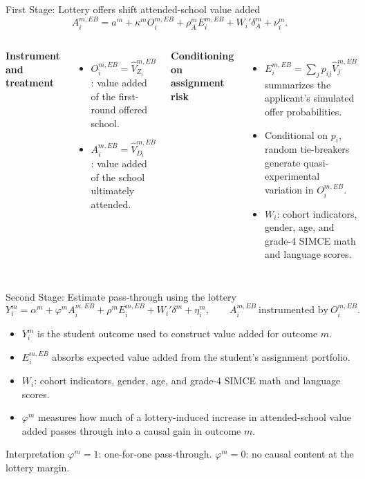 \documentclass[11pt,aspectratio=169]{beamer}
\let\oldparencite\parencite
\renewcommand{\parencite}[2][]{%
  \footnotesize {\tiny \oldparencite[#1]{#2}} \normalsize%
}
\newenvironment{wideitemize}{%
  \begin{minipage}{0.92\textwidth}
  \begin{itemize}
  \addtolength{\itemsep}{0.75em}
}{%
  \end{itemize}
  \end{minipage}
}
\begin{document}
\begin{frame}{First Stage: Lottery offers shift attended-school value added}
\small
\[
A_i^{m,EB}
=
a^m
+\kappa^m O_i^{m,EB}
+\rho_A^m E_i^{m,EB}
+W_i'\delta_A^m
+\nu_i^m.
\]

\begin{columns}[T,onlytextwidth]
  \textbf{Instrument and treatment}
  \begin{itemize}
    \item $O_i^{m,EB}=\widehat V_{Z_i}^{m,EB}$: value added of the first-round offered school.
    \item $A_i^{m,EB}=\widehat V_{D_i}^{m,EB}$: value added of the school ultimately attended.
  \end{itemize}

  \textbf{Conditioning on assignment risk}
  \begin{itemize}
    \item $E_i^{m,EB}=\sum_j p_{ij}\widehat V_j^{m,EB}$ summarizes the applicant's simulated offer probabilities.
    \item Conditional on $p_i$, random tie-breakers generate quasi-experimental variation in $O_i^{m,EB}$.
    \item $W_i$: cohort indicators, gender, age, and grade-4 SIMCE math and language scores.
  \end{itemize}
\end{columns}

\end{frame}
\begin{frame}{Second Stage: Estimate pass-through using the lottery}
\small
\[
Y_i^m
=
\alpha^m
+\varphi^m A_i^{m,EB}
+\rho^m E_i^{m,EB}
+W_i'\delta^m
+\eta_i^m,
\qquad
A_i^{m,EB}\ \text{instrumented by}\ O_i^{m,EB}.
\]

\begin{wideitemize}
  \addtolength{\itemsep}{-0.15em}
  \item $Y_i^m$ is the student outcome used to construct value added for outcome $m$.
  \item $E_i^{m,EB}$ absorbs expected value added from the student's assignment portfolio.
  \item $W_i$: cohort indicators, gender, age, and grade-4 SIMCE math and language scores.
  \item $\varphi^m$ measures how much of a lottery-induced increase in attended-school value added passes through into a causal gain in outcome $m$.
\end{wideitemize}

\vspace{0.1em}
\begin{alertblock}{Interpretation}
$\varphi^m=1$: one-for-one pass-through.\hfill
$\varphi^m=0$: no causal content at the lottery margin.
\end{alertblock}
\end{frame}
\end{document}
